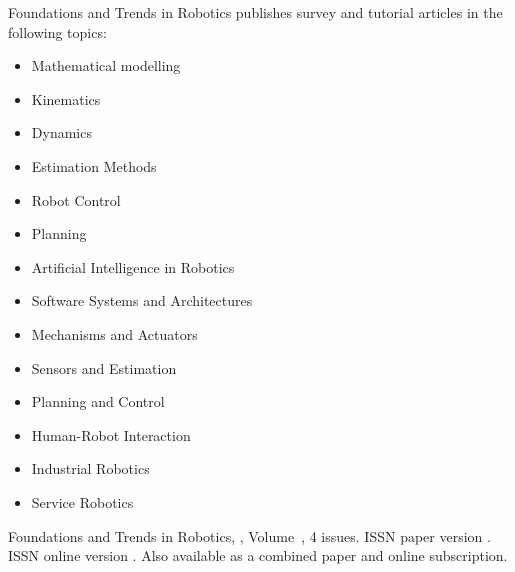 


\journalaimsandscope
 {%
  Foundations and Trends\textsuperscript{\textregistered} in
Robotics publishes
 survey and tutorial articles in the following topics:
\begin{multicols}{2}\raggedcolumns
 \begin{itemize}
\item{Mathematical modelling}
\item{Kinematics}
\item{Dynamics}
\item{Estimation Methods}
\item{Robot Control}
\item{Planning}
\item{Artificial Intelligence in Robotics}
\item{Software Systems and Architectures}
\item{Mechanisms and Actuators}
\item{Sensors and Estimation}
\item{Planning and Control}
\item{Human-Robot Interaction}
\item{Industrial Robotics}
\item{Service Robotics }
\end{itemize}
\end{multicols}
 }


\journallibraryinfo
 {%
  Foundations and Trends\textsuperscript{\textregistered} in
  Robotics, ,
  Volume~, 4 issues.
  ISSN paper version .
  ISSN online version .
  Also available as a combined paper and online
  subscription.
 } 